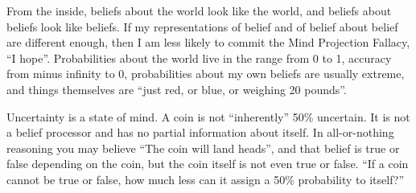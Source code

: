 From the inside, beliefs about the world look like the world, and beliefs about beliefs look like beliefs. If my representations of belief and of belief about belief are different enough, then I am less likely to commit the Mind Projection Fallacy, ``I hope''. Probabilities about the world live in the range from 0 to 1, accuracy from minus infinity to 0, probabilities about my own beliefs are usually extreme, and things themselves are ``just red, or blue, or weighing 20 pounds''. 

Uncertainty is a state of mind. A coin is not ``inherently'' 50\% uncertain. It is not a belief processor and has no partial information about itself. In all-or-nothing reasoning you may believe ``The coin will land heads'', and that belief is true or false depending on the coin, but the coin itself is not even true or false. ``If a coin cannot be true or false, how much less can it assign a 50\% probability to itself?''
